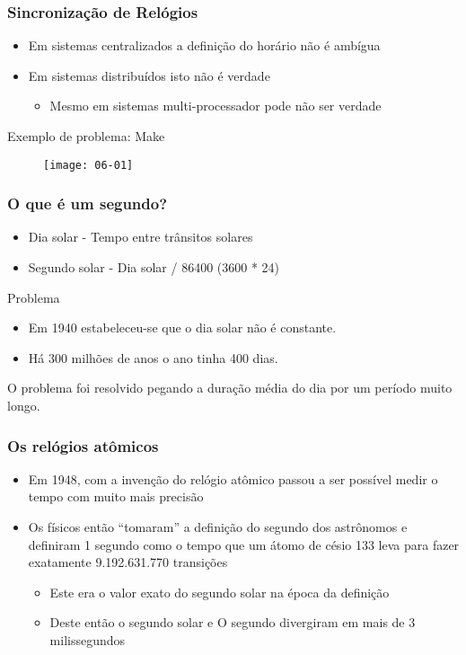 \documentclass[Ligatures=TeX,table,brazil,svgnames,usetotalslideindicator,compress,10pt]{beamer}
\begin{document}
\begin{frame}
  \frametitle{Sincronização de Relógios}
  \begin{itemize}
  \item Em sistemas centralizados a definição do horário não é ambígua
  \item Em sistemas distribuídos isto não é verdade
    \begin{itemize}
    \item Mesmo em sistemas multi-processador pode não ser verdade
    \end{itemize}
  \end{itemize}

    \begin{block}{Exemplo de problema: Make}
    \begin{figure}
      \centering
      \texttt{[image: 06-01]}
    \end{figure}
  \end{block}

\end{frame}

\begin{frame}
  \frametitle{O que é um segundo?}
  \begin{itemize}
  \item \alert{Dia solar} - Tempo entre trânsitos solares
  \item \alert{Segundo solar} - Dia solar / 86400 (3600 * 24)
  \end{itemize}
  \begin{alertblock}{Problema}
    \begin{itemize}
    \item Em 1940 estabeleceu-se que o dia solar não é constante.
    \item Há 300 milhões de anos o ano tinha 400 dias.
    \end{itemize}
  \end{alertblock}
  O problema foi resolvido pegando a duração média do dia por um
  período muito longo.
\end{frame}

\begin{frame}
  \frametitle{Os relógios atômicos}
  \begin{itemize}
  \item Em 1948, com a invenção do relógio atômico passou a ser
    possível medir o tempo com muito mais precisão
  \item Os físicos então ``tomaram'' a definição do segundo dos astrônomos
    e definiram 1 segundo como o tempo que um átomo de césio 133 leva
    para fazer exatamente 9.192.631.770 transições
    \begin{itemize}
    \item Este era o valor exato do segundo solar na época da definição
    \item Deste então o segundo solar e O segundo divergiram em mais de 3 milissegundos
    \end{itemize}
  \end{itemize}
\end{frame}
\end{document}
